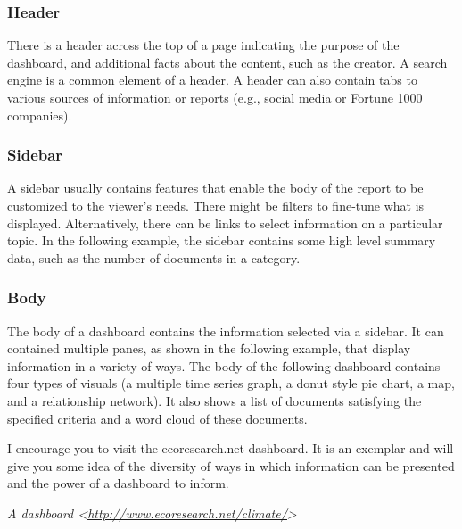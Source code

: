 \documentclass[
]{article}
\begin{document}
\hypertarget{header}{%
\subsubsection*{Header}\label{header}}

There is a header across the top of a page indicating the purpose of the
dashboard, and additional facts about the content, such as the creator.
A search engine is a common element of a header. A header can also
contain tabs to various sources of information or reports (e.g., social
media or Fortune 1000 companies).

\hypertarget{sidebar}{%
\subsubsection*{Sidebar}\label{sidebar}}

A sidebar usually contains features that enable the body of the report
to be customized to the viewer's needs. There might be filters to
fine-tune what is displayed. Alternatively, there can be links to select
information on a particular topic. In the following example, the sidebar
contains some high level summary data, such as the number of documents
in a category.

\hypertarget{body}{%
\subsubsection*{Body}\label{body}}

The body of a dashboard contains the information selected via a sidebar.
It can contained multiple panes, as shown in the following example, that
display information in a variety of ways. The body of the following
dashboard contains four types of visuals (a multiple time series graph,
a donut style pie chart, a map, and a relationship network). It also
shows a list of documents satisfying the specified criteria and a word
cloud of these documents.

I encourage you to visit the ecoresearch.net dashboard. It is an
exemplar and will give you some idea of the diversity of ways in which
information can be presented and the power of a dashboard to inform.

\emph{A dashboard
\textless{}\href{http://www.ecoresearch.net/climate/}{\underline{http://www.ecoresearch.net/climate/}}\textgreater{}}
\end{document}
